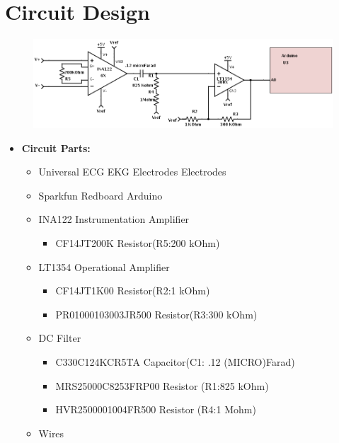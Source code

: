 \documentclass[11pt, oneside]{article}   	%
\begin{document}
\section{Circuit Design}
\begin{figure}[htb!]
\centering
\includegraphics[width=\textwidth]{blockdiagnew}
\end{figure}
\begin{itemize}[leftmargin=*]
\subsection{Components}
		\item[] \textbf{Circuit Parts:}
			\begin{itemize} 
				\item Universal ECG EKG Electrodes Electrodes
				\item Sparkfun Redboard Arduino
				\item INA122 Instrumentation Amplifier
					\begin{itemize}
						\item CF14JT200K Resistor(R5:200 kOhm)
					\end{itemize} 
				\item LT1354 Operational Amplifier
					\begin{itemize}
						\item CF14JT1K00 Resistor(R2:1 kOhm)
						\item PR01000103003JR500 Resistor(R3:300 kOhm)
					\end{itemize}
				\item DC Filter
					\begin{itemize}
						\item C330C124KCR5TA Capacitor(C1: .12 (MICRO)Farad)
						\item MRS25000C8253FRP00 Resistor (R1:825 kOhm)
						\item HVR2500001004FR500 Resistor (R4:1 Mohm)
					\end{itemize}
				\item Wires
			\end{itemize}

\end{itemize}
\end{document}
